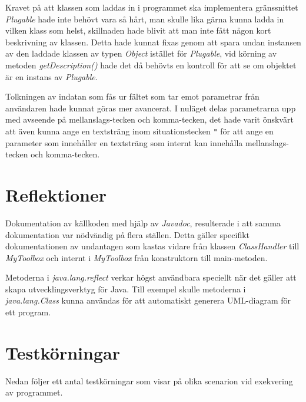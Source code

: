 \documentclass[a4paper, 12pt]{article}
\begin{document}
Kravet på att klassen som laddas in i programmet ska implementera
gräns\-snittet \textit{Plugable} hade inte behövt vara så hårt, man
skulle lika gärna kunna ladda in vilken klass som helst, skillnaden
hade blivit att man inte fått någon kort beskrivning av klassen. Detta
hade kunnat fixas genom att spara undan instansen av den laddade
klassen av typen \textit{Object} istället för \textit{Plugable}, vid
körning av metoden \textit{getDescription()} hade det då behövts en
kontroll för att se om objektet är en instans av \textit{Plugable}.

Tolkningen av indatan som fås ur fältet som tar emot parametrar från
anv\-ändaren hade kunnat göras mer avancerat. I nuläget delas
parametrarna upp med avseende på mellanslags-tecken och komma-tecken,
det hade varit önskvärt att även kunna ange en textsträng inom
situationstecken \verb!"! för att ange en parameter som innehåller en
textsträng som internt kan innehålla mellanslags-tecken och
komma-tecken.


\section{Reflektioner}

Dokumentation av källkoden med hjälp av \textit{Javadoc}, resulterade
i att samma dokumentation var nödvändig på flera ställen. Detta gäller
specifikt dokumentationen av undantagen som kastas vidare från klassen
\textit{ClassHandler} till \textit{MyToolbox} och internt i
\textit{MyToolbox} från konstruktorn till main-metoden.

Metoderna i \textit{java.lang.reflect} verkar högst användbara
speciellt när det gäller att skapa utvecklingsverktyg för Java. Till
exempel skulle metoderna i \textit{java.lang.Class} kunna användas för
att automatiskt generera UML-diagram för ett program.

\section{Testkörningar}
Nedan följer ett antal testkörningar som visar på olika scenarion vid
exekvering av programmet.
\end{document}
